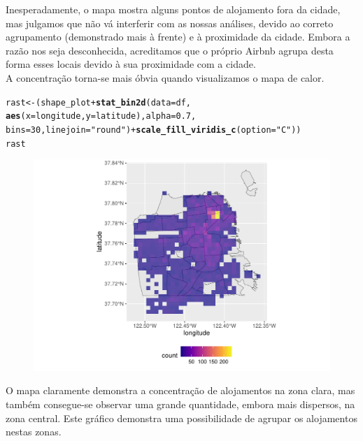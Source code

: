 \documentclass[justified, 11pt]{scrartcl}\usepackage[]{graphicx}\usepackage[]{xcolor}
\makeatletter
\def\maxwidth{ %
  \ifdim\Gin@nat@width>\linewidth
    \linewidth
  \else
    \Gin@nat@width
  \fi
}
\newcommand{\hlnum}[1]{\textcolor[rgb]{0.686,0.059,0.569}{#1}}%
\newcommand{\hlstr}[1]{\textcolor[rgb]{0.192,0.494,0.8}{#1}}%
\newcommand{\hlopt}[1]{\textcolor[rgb]{0,0,0}{#1}}%
\newcommand{\hlstd}[1]{\textcolor[rgb]{0.345,0.345,0.345}{#1}}%
\newcommand{\hlkwb}[1]{\textcolor[rgb]{0.69,0.353,0.396}{#1}}%
\newcommand{\hlkwc}[1]{\textcolor[rgb]{0.333,0.667,0.333}{#1}}%
\newcommand{\hlkwd}[1]{\textcolor[rgb]{0.737,0.353,0.396}{\textbf{#1}}}%
\newenvironment{kframe}{%
 \def\at@end@of@kframe{}%
 \ifinner\ifhmode%
  \def\at@end@of@kframe{\end{minipage}}%
  \begin{minipage}{\columnwidth}%
 \fi\fi%
 \def\FrameCommand##1{\hskip\@totalleftmargin \hskip-\fboxsep
 \colorbox{shadecolor}{##1}\hskip-\fboxsep
     \hskip-\linewidth \hskip-\@totalleftmargin \hskip\columnwidth}%
 \MakeFramed {\advance\hsize-\width
   \@totalleftmargin\z@ \linewidth\hsize
   \@setminipage}}%
 {\par\unskip\endMakeFramed%
 \at@end@of@kframe}
\newenvironment{knitrout}{}{} %
\makeatother
\begin{document}
Inesperadamente, o mapa mostra alguns pontos de alojamento fora da cidade, mas julgamos que não vá interferir com as nossas análises, devido ao correto agrupamento (demonstrado mais à frente) e à proximidade da cidade. Embora a razão nos seja desconhecida, acreditamos que o próprio Airbnb agrupa desta forma esses locais devido à sua proximidade com a cidade. \\
A concentração torna-se mais óbvia quando visualizamos o mapa de calor.
\begin{knitrout}
\color{fgcolor}\begin{kframe}
\begin{alltt}
\hlstd{rast} \hlkwb{<-} \hlstd{(shape_plot} \hlopt{+} \hlkwd{stat_bin2d}\hlstd{(}\hlkwc{data} \hlstd{= df,}
  \hlkwd{aes}\hlstd{(}\hlkwc{x} \hlstd{= longitude,} \hlkwc{y} \hlstd{= latitude),} \hlkwc{alpha} \hlstd{=} \hlnum{0.7}\hlstd{,}
  \hlkwc{bins} \hlstd{=} \hlnum{30}\hlstd{,} \hlkwc{linejoin} \hlstd{=} \hlstr{"round"}\hlstd{)} \hlopt{+} \hlkwd{scale_fill_viridis_c}\hlstd{(}\hlkwc{option} \hlstd{=} \hlstr{"C"}\hlstd{))}
\hlstd{rast}
\end{alltt}
\end{kframe}\begin{figure}
\includegraphics[width=\maxwidth]{figure/chunk-rasterPlaces-1} \end{figure}

\end{knitrout}
O mapa claramente demonstra a concentração de alojamentos na zona clara, mas também consegue-se observar uma grande quantidade, embora mais dispersos, na zona central. Este gráfico demonstra uma possibilidade de agrupar os alojamentos nestas zonas.
\end{document}
